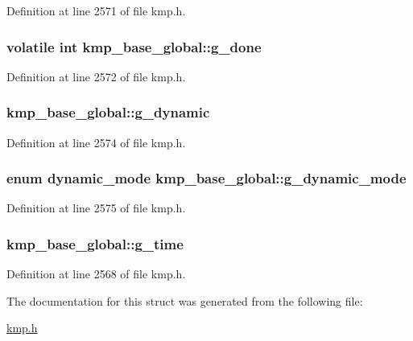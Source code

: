Definition at line 2571 of file kmp.\-h.

\hypertarget{structkmp__base__global_aaf20619e3822842a92962506f4c18b97}{
\subsubsection[{g\-\_\-done}]{\setlength{\rightskip}{0pt plus 5cm}volatile {\bf int} kmp\-\_\-base\-\_\-global\-::g\-\_\-done}}\label{structkmp__base__global_aaf20619e3822842a92962506f4c18b97}


Definition at line 2572 of file kmp.\-h.

\hypertarget{structkmp__base__global_ae97c056c2befd4b0fe07a11d7eeb5b83}{
\subsubsection[{g\-\_\-dynamic}]{ kmp\-\_\-base\-\_\-global\-::g\-\_\-dynamic}}\label{structkmp__base__global_ae97c056c2befd4b0fe07a11d7eeb5b83}


Definition at line 2574 of file kmp.\-h.

\hypertarget{structkmp__base__global_a4954f98fc3d44f85315a09b4faceef3e}{
\subsubsection[{g\-\_\-dynamic\-\_\-mode}]{\setlength{\rightskip}{0pt plus 5cm}enum {\bf dynamic\-\_\-mode} kmp\-\_\-base\-\_\-global\-::g\-\_\-dynamic\-\_\-mode}}\label{structkmp__base__global_a4954f98fc3d44f85315a09b4faceef3e}


Definition at line 2575 of file kmp.\-h.

\hypertarget{structkmp__base__global_a761441e9b7be073b62ef0a2575edacd7}{
\subsubsection[{g\-\_\-time}]{ kmp\-\_\-base\-\_\-global\-::g\-\_\-time}}\label{structkmp__base__global_a761441e9b7be073b62ef0a2575edacd7}


Definition at line 2568 of file kmp.\-h.



The documentation for this struct was generated from the following file\-:\begin{DoxyCompactItemize}
\item 
\hyperlink{kmp_8h}{kmp.\-h}\end{DoxyCompactItemize}
